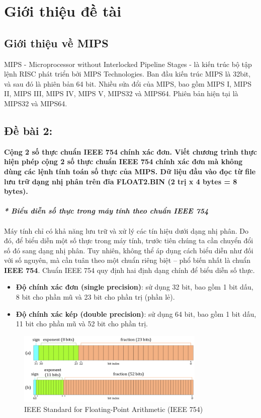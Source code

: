 \section{Giới thiệu đề tài}

\subsection{Giới thiệu về MIPS}
\indent MIPS - Microprocessor without Interlocked Pipeline Stages - là kiến trúc bộ tập lệnh RISC phát triển
bởi MIPS Technologies. Ban đầu kiến trúc MIPS là 32bit, và sau đó là phiên bản 64 bit. Nhiều sửa đổi
của MIPS, bao gồm MIPS I, MIPS II, MIPS III, MIPS IV, MIPS V, MIPS32 và MIPS64. Phiên bản hiện
tại là MIPS32 và MIPS64.
\subsection{Đề bài 2:}
\textbf{Cộng 2 số thực chuẩn IEEE 754 chính xác đơn.
Viết chương trình thực hiện phép cộng 2 số thực chuẩn IEEE 754 chính xác đơn mà không dùng
các lệnh tính toán số thực của MIPS. Dữ liệu đầu vào đọc từ file lưu trữ dạng nhị phân trên đĩa
FLOAT2.BIN (2 trị x 4 bytes = 8 bytes). 
}\\\\
\textbf{\textit{* Biểu diễn số thực trong máy tính theo chuẩn IEEE 754}}\\\\
Máy tính chỉ có khả năng lưu trữ và xử lý các tín hiệu dưới dạng nhị phân. Do đó, để biểu diễn một số thực trong máy tính, trước tiên chúng ta cần chuyển đổi số đó sang dạng nhị phân. Tuy nhiên, không thể áp dụng cách biểu diễn như đối với số nguyên, mà cần tuân theo một chuẩn riêng biệt – phổ biến nhất là chuẩn \textbf{IEEE 754}.
Chuẩn IEEE 754 quy định hai định dạng chính để biểu diễn số thực.
\begin{itemize}
    \item \textbf{Độ chính xác đơn (single precision)}: sử dụng 32 bit, bao gồm 1 bit dấu, 8 bit cho phần mũ và 23 bit cho phần trị (phần lẻ).
    \item \textbf{Độ chính xác kép (double precision)}: sử dụng 64 bit, bao gồm 1 bit dấu, 11 bit cho phần mũ và 52 bit cho phần trị.
\end{itemize}
\begin{figure}[!h]
    \centering 
    \includegraphics[width=0.8\textwidth]{image/IEEE Standard for Floating-Point Arithmetic (IEEE 754).png}
    \vspace{0.5cm} %
      \caption{ IEEE Standard for Floating-Point Arithmetic (IEEE 754)}
\end{figure}


